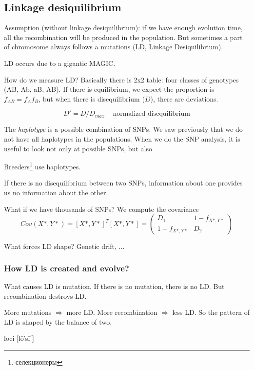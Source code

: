 \documentclass[main.tex]{subfiles}
\begin{document}
\subsection{ Linkage desiquilibrium }

Assumption (without linkage desiquilibrium): if we have enough evolution time, all the recombination will be produced in the population.
But sometimes a part of chromosome always follows a mutations (LD, Linkage Desiquilibrium).

LD occurs due to a gigantic MAGIC.

How do we measure LD?
Basically there is 2x2 table: four classes of genotypes (AB, Ab, aB, AB).
If there is equilibrium, we expect the proportion is $ f_{AB} = f_A f_B $, but when there is disequilibrium ($D$), there are deviations.

\[ D' = D / D_{max} \text{ -- normalized disequilibrium} \]

The \emph{haplotype} is a possible combination of SNPs.
We saw previously that we do not have all haplotypes in the populations.
When we do the SNP analysis, it is useful to look not only at possible SNPs, but also

Breeders\footnote{селекционеры} use haplotypes.

If there is no disequilibrium between two SNPs, information about one provides us no information about the other.

What if we have thousands of SNPs?
We compute the covariance
\[ Cov(X*, Y*) = [X*, Y*]^T [X*, Y*] = \begin{pmatrix}
    D_1 & 1 - f_{X*,Y*} \\
    1 - f_{X*, Y*} & D_2
\end{pmatrix} \] %

What forces LD shape? Genetic drift, ... %

\subsubsection{How LD is created and evolve?}

What causes LD is mutation.
If there is no mutation, there is no LD.
But recombination destroys LD.

More mutations $\Rightarrow$ more LD.
More recombination $ \Rightarrow $ less LD.
So the pattern of LD is shaped by the balance of two.

\begin{leftbar}
    loci  [lō′sī΄]
\end{leftbar}
\end{document}
